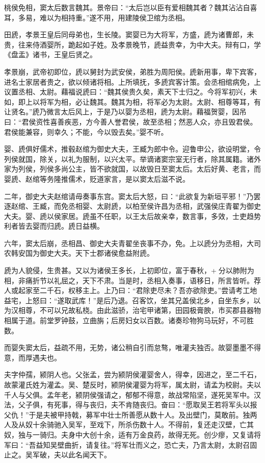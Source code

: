 \documentclass[12pt,UTF8]{ctexbook}
\begin{document}
桃侯免相，窦太后数言魏其。景帝曰：“太后岂以臣有爱相魏其者？魏其沾沾自喜耳，多易，难以为相持重。”遂不用，用建陵侯卫绾为丞相。



田虒，孝景王皇后同母弟也，生长陵。窦婴已为大将军，方盛，虒为诸曹郎，未贵，往来侍酒婴所，跪起如子姓。及孝景晚节，虒益贵幸，为中大夫。辩有口，学《盘盂》诸书，王皇后贤之。



孝景崩，武帝初即位，虒以舅封为武安侯，弟胜为周阳侯。虒新用事，卑下宾客，进名士家居者贵之，欲以倾诸将相。上所填抚，多虒宾客计策。会丞相绾病免，上议置丞相、太尉。藉福说虒曰：“魏其侯贵久矣，素天下士归之。今将军初兴，未如，即上以将军为相，必让魏其。魏其为相，将军必为太尉。太尉、相尊等耳，有让贤名。”虒乃微言太后风上，于是乃以婴为丞相，虒为太尉。藉福贺婴，因吊曰：“君侯资性喜善疾恶，方今善人誉君侯，故至丞相；然恶人众，亦且毁君侯。君侯能兼容，则幸久；不能，今以毁去矣。”婴不听。



婴、虒俱好儒术，推毂赵绾为御史大夫，王臧为郎中令。迎鲁申公，欲设明堂，令列侯就国，除关，以礼为服制，以兴太平。举谪诸窦宗室无行者，除其属籍。诸外家为列侯，列侯多尚公主，皆不欲就国，以故毁日至窦太后。太后好黄、老言，而婴虒、赵绾等务隆推儒术，贬道家言，是以窦太后滋不说。



二年，御史大夫赵绾请毋奏事东宫。窦太后大怒，曰：“此欲复为新垣平邪！”乃罢逐赵绾、王臧，而免丞相婴、太尉虒，以柏至侯许昌为丞相，武强侯庄青翟为御史大夫。婴、虒以侯家居。虒虽不任职，以王太后故亲幸，数言事，多效，士吏趋势利者皆去婴而归虒。虒日益横。



六年，窦太后崩，丞相昌、御史大夫青翟坐丧事不办，免。上以虒分为丞相，大司农韩安国为御史大夫。天下士郡诸侯愈益附虒。



虒为人貌侵，生贵甚。又以为诸侯王多长，上初即位，富于春秋，+分以肺附为相，非痛折节以礼屈之，天下不肃。当是时，丞相入奏事，语移日，所言皆听。荐人或起家至二千石，权移主上。上乃曰：“君除吏尽未？吾亦欲除吏。”尝请考工地益宅，上怒曰：“遂取武库！”是后乃退。召客饮，坐其兄盖侯北乡，自坐东乡，以为汉相尊，不可以兄故私桡。由此滋骄，治宅甲诸第，田园极膏腴，市买郡县器物相属于道。前堂罗钟鼓，立曲旃；后房妇女以百数。诸奏珍物狗马玩好，不可胜数。



而婴失窦太后，益疏不用，无势，诸公稍自引而怠骜，唯灌夫独否。故婴墨墨不得意，而厚遇夫也。



夫字仲孺，颍阴人也。父张孟，尝为颍阴侯灌婴舍人，得幸，因进之，至二千石，故蒙灌氏姓为灌孟。吴、楚反时，颍阴侯灌婴为将军，属太尉，请孟为校尉。夫以千人与父俱。孟年老，颍阴侯强请之，郁郁不得意，故战常陷坚，遂死吴军中。汉法，父子俱，有死事，得与丧归，夫不肯随丧归。奋曰：“愿取吴王若将军头以报父仇！”于是夫被甲持戟，募军中壮士所善愿从数十人。及出壁门，莫敢前。独两人及从奴十余骑驰入吴军，至戏下，所杀伤数十人。不得前，复还走汉壁，亡其奴，独与一骑归。夫身中大创十余，适有万金良药，故得无死。创少瘳，又复请将军曰：“吾益知吴壁曲折，请复往。”将军壮而义之，恐亡夫，乃言太尉，太尉召固止之。吴军破，夫以此名闻天下。
\end{document}
